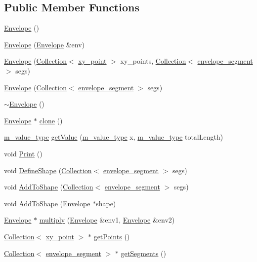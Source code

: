 \subsection*{Public Member Functions}
\begin{CompactItemize}
\item 
\hyperlink{classEnvelope_a0}{Envelope} ()
\item 
\hyperlink{classEnvelope_a1}{Envelope} (\hyperlink{classEnvelope}{Envelope} \&env)
\item 
\hyperlink{classEnvelope_a2}{Envelope} (\hyperlink{classCollection}{Collection}$<$ \hyperlink{structxy__point}{xy\_\-point} $>$ xy\_\-points, \hyperlink{classCollection}{Collection}$<$ \hyperlink{structenvelope__segment}{envelope\_\-segment} $>$ segs)
\item 
\hyperlink{classEnvelope_a3}{Envelope} (\hyperlink{classCollection}{Collection}$<$ \hyperlink{structenvelope__segment}{envelope\_\-segment} $>$ segs)
\item 
\hyperlink{classEnvelope_a4}{$\sim$Envelope} ()
\item 
\hyperlink{classEnvelope}{Envelope} $\ast$ \hyperlink{classEnvelope_a5}{clone} ()
\item 
\hyperlink{Types_8h_a3}{m\_\-value\_\-type} \hyperlink{classEnvelope_a6}{get\-Value} (\hyperlink{Types_8h_a3}{m\_\-value\_\-type} x, \hyperlink{Types_8h_a3}{m\_\-value\_\-type} total\-Length)
\item 
void \hyperlink{classEnvelope_a7}{Print} ()
\item 
void \hyperlink{classEnvelope_a8}{Define\-Shape} (\hyperlink{classCollection}{Collection}$<$ \hyperlink{structenvelope__segment}{envelope\_\-segment} $>$ segs)
\item 
void \hyperlink{classEnvelope_a9}{Add\-To\-Shape} (\hyperlink{classCollection}{Collection}$<$ \hyperlink{structenvelope__segment}{envelope\_\-segment} $>$ segs)
\item 
void \hyperlink{classEnvelope_a10}{Add\-To\-Shape} (\hyperlink{classEnvelope}{Envelope} $\ast$shape)
\item 
\hyperlink{classEnvelope}{Envelope} $\ast$ \hyperlink{classEnvelope_a11}{multiply} (\hyperlink{classEnvelope}{Envelope} \&env1, \hyperlink{classEnvelope}{Envelope} \&env2)
\item 
\hyperlink{classCollection}{Collection}$<$ \hyperlink{structxy__point}{xy\_\-point} $>$ $\ast$ \hyperlink{classEnvelope_a12}{get\-Points} ()
\item 
\hyperlink{classCollection}{Collection}$<$ \hyperlink{structenvelope__segment}{envelope\_\-segment} $>$ $\ast$ \hyperlink{classEnvelope_a13}{get\-Segments} ()

\end{CompactItemize}
